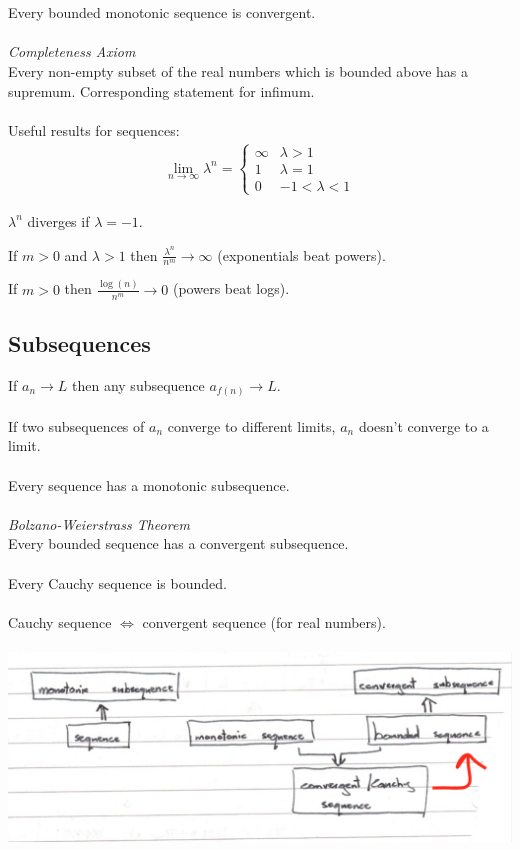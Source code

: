 \documentclass{article}
\begin{document}
\\\\
Every bounded monotonic sequence is convergent.
\\\\
\textit{Completeness Axiom}
\\
Every non-empty subset of the real numbers which is bounded above has a supremum. Corresponding statement for infimum.
\\\\
Useful results for sequences:
\begin{align}
\lim_{n \to \infty} \lambda^{n} = 
\begin{cases}
\infty & \lambda > 1 \\
1 & \lambda = 1 \\
0 & -1 < \lambda < 1
\end{cases}
\end{align}
\begin{center}
$ \lambda^{n} $ diverges if $ \lambda = -1 $.
\end{center}
\begin{center}
If $ m > 0 $ and $ \lambda > 1 $ then $ \frac{\lambda^{n}}{n^{m}} \to \infty $ (exponentials beat powers).
\end{center}
\begin{center}
If $ m > 0 $ then $ \frac{\log(n)}{n^{m}} \to 0 $ (powers beat logs).
\end{center}

\subsection{Subsequences}
If $ a_{n} \to L $ then any subsequence $ a_{f(n)} \to L $.
\\\\
If two subsequences of $ a_{n} $ converge to different limits, $ a_{n} $ doesn't converge to a limit.
\\\\
Every sequence has a monotonic subsequence.
\\\\
\textit{Bolzano-Weierstrass Theorem}
\\
Every bounded sequence has a convergent subsequence.
\\\\
Every Cauchy sequence is bounded.
\\\\
Cauchy sequence $ \Leftrightarrow $ convergent sequence (for real numbers).
\\\\
\hspace*{-1in}
\includegraphics[scale=0.4]{sequences}
\end{document}
